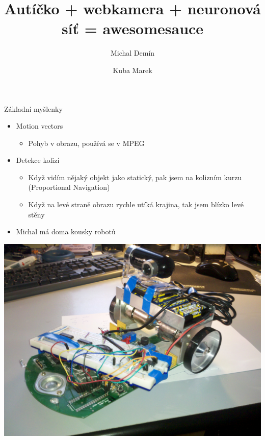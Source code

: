 \documentclass{beamer}
\title{Autíčko + webkamera + neuronová síť = awesomesauce}
\author{Michal Demín \and Kuba Marek}
\date{}
\begin{document}
\begin{frame}[plain]
\titlepage
\end{frame}

\begin{frame}{Základní myšlenky}
\begin{itemize}
\item Motion vectors
	\begin{itemize}
	\item Pohyb v obrazu, používá se v MPEG
	\end{itemize}
\item Detekce kolizí
	\begin{itemize}
	\item Když vidím nějaký objekt jako statický, pak jsem na kolizním kurzu (Proportional Navigation)
	\item Když na levé straně obrazu rychle utíká krajina, tak jsem blízko levé stěny
	\end{itemize}
\item Michal má doma kousky robotů
\end{itemize}
\end{frame}

\hspace{-1.39cm}
\begin{frame}[plain]
\begin{centering}
\includegraphics[width=1.05\paperwidth]{img1.jpg}
\end{centering}
\end{frame}
\end{document}
